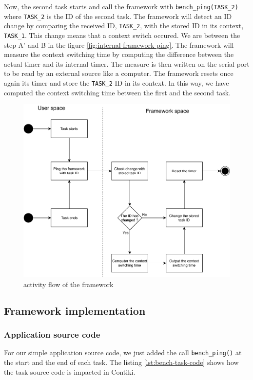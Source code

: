 Now, the second task starts and call the framework with \texttt{bench\_ping(TASK\_2)} where \texttt{TASK\_2} is the ID of the second task.
The framework will detect an ID change by comparing the received ID, \texttt{TASK\_2}, with the stored ID in its context, \texttt{TASK\_1}.
This change means that a context switch occured.
We are between the step A' and B in the figure \ref{fig:internal-framework-ping}.
The framework will measure the context switching time by computing the difference between the actual timer and its internal timer.
The measure is then written on the serial port to be read by an external source like a computer.
The framework resets once again its timer and store the \texttt{TASK\_2} ID in its context.
In this way, we have computed the context switching time between the first and the second task.

\begin{figure}[!ht]
  \centering
  \includegraphics[scale=0.7]{assets/extension-activity-framework.pdf}
  \caption{activity flow of the framework\label{fig:extension-activity-framework}}
\end{figure}

\subsection{Framework implementation}

\subsubsection{Application source code}
For our simple application source code, we just added the call \texttt{bench\_ping()} at the start and the end of each task.
The listing \ref{lst:bench-task-code} shows how the task source code is impacted in Contiki.

